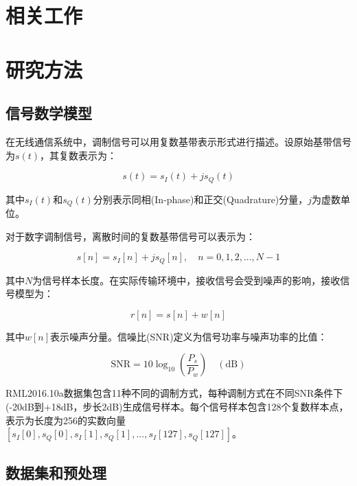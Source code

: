 \documentclass[conference]{IEEEtran}
\begin{document}
\section{相关工作}

\section{研究方法}

\subsection{信号数学模型}

在无线通信系统中，调制信号可以用复数基带表示形式进行描述。设原始基带信号为$s(t)$，其复数表示为：

\begin{equation}
s(t) = s_I(t) + js_Q(t)
\end{equation}

其中$s_I(t)$和$s_Q(t)$分别表示同相(In-phase)和正交(Quadrature)分量，$j$为虚数单位。

对于数字调制信号，离散时间的复数基带信号可以表示为：

\begin{equation}
s[n] = s_I[n] + js_Q[n], \quad n = 0, 1, 2, ..., N-1
\end{equation}

其中$N$为信号样本长度。在实际传输环境中，接收信号会受到噪声的影响，接收信号模型为：

\begin{equation}
r[n] = s[n] + w[n]
\end{equation}

其中$w[n]$表示噪声分量。信噪比(SNR)定义为信号功率与噪声功率的比值：

\begin{equation}
\mathrm{SNR} = 10\log_{10}\left(\frac{P_s}{P_w}\right) \quad(\mathrm{dB})
\end{equation}


RML2016.10a数据集包含11种不同的调制方式，每种调制方式在不同SNR条件下(-20dB到+18dB，步长2dB)生成信号样本。每个信号样本包含128个复数样本点，表示为长度为256的实数向量$[s_I[0], s_Q[0], s_I[1], s_Q[1], ..., s_I[127], s_Q[127]]$。

\subsection{数据集和预处理}
\end{document}
